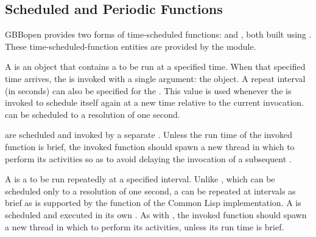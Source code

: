 \documentclass[10pt,twoside,english,pdftex]{article}
\begin{document}
\T\markright{}%
\T\pagestyle{plain}
\T\clearpage
\W{}
\T\pagestyle{fancy}
\T\thispagestyle{fancybottom}
\T\global\def\fnlastname{ }%

\subsection{Scheduled and Periodic Functions}
\label{sec:scheduledfunctions}%

%
%
GBBopen provides two forms of time-scheduled functions:
 and , both built using
.  These
time-scheduled-function entities are provided by the
 module.


A  is an object that contains a  to
be run at a specified time. When that specified time arrives, the
 is invoked with a single argument: the
 object. A repeat interval (in seconds) can also be
specified for the . This value is used whenever the
 is invoked to schedule itself again at a new time
relative to the current invocation.   can be
scheduled to a resolution of one second.

 are scheduled and invoked by a separate
 .  Unless the run
time of the invoked function is brief, the invoked function should spawn a new
thread in which to perform its activities so as to avoid delaying the
invocation of a subsequent .


%
%
A  is a  to be run repeatedly at a
specified interval.  Unlike , which can be
scheduled only to a resolution of one second, a  can
be repeated at intervals as brief as is supported by the 
function of the Common Lisp implementation.  A  is
scheduled and executed in its own .  As with
, the invoked function should spawn a new thread in
which to perform its activities, unless its run time is brief.
\end{document}
